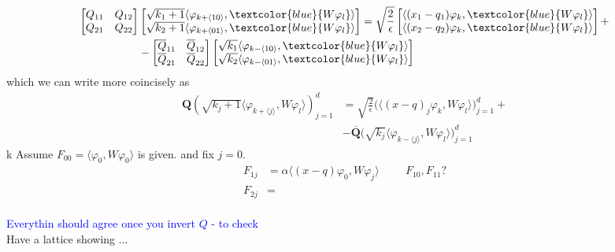 \begin{align}
  \begin{split}
    \begin{bmatrix}
    Q_{11} & Q_{12}
    \\
    Q_{21} & Q_{22}
  \end{bmatrix}
  &\begin{bmatrix}
  \sqrt{k_{1} + 1}
  \langle \varphi_{k + \langle 10 \rangle},
    \textcolor{blue}{W\varphi_l}\rangle
    \\
  \sqrt{k_{2} + 1}
  \langle \varphi_{k + \langle 01 \rangle},
    \textcolor{blue}{W\varphi_l} \rangle
  \end{bmatrix}
  =
  \sqrt{\frac{2}{\epsilon}}
  \begin{bmatrix}
    \langle (x_1 - q_1)\varphi_k, \textcolor{blue}{W \varphi_l} \rangle
    \\
    \langle (x_2 - q_2)\varphi_k, \textcolor{blue}{W \varphi_l} \rangle
  \end{bmatrix}
  +
  \\
   &-
  \begin{bmatrix}
    \overline{Q}_{11} & \overline{Q}_{12}
    \\
    \overline{Q}_{21} & \overline{Q}_{22}
  \end{bmatrix}
  \begin{bmatrix}
    \sqrt{k_1}
    \langle\varphi_{k - \langle 10 \rangle},
    \textcolor{blue}{W\varphi_l}\rangle
    \\
    \sqrt{k_2}
 \langle\varphi_{k - \langle 01 \rangle},
   \textcolor{blue}{W\varphi_l}\rangle  \end{bmatrix}
  \end{split}
\end{align}
which we can write more coincisely as
\begin{equation}
  \begin{split}
    \bm{Q} \left( \sqrt{k_j + 1}
    \langle \varphi_{k + \langle j \rangle}, 
    W \varphi_l 
    \rangle
  \right)_{j = 1}^d
  &= 
  \sqrt{\frac{2}{\epsilon}}
  \Big( \langle (x - q)_j \varphi_k,
  W \varphi_l \rangle 
  \Big)_{j=1}^d
  +
  \\
  &
  - \bm{\overline{Q}} 
  \Big( 
    \sqrt{k_j} \langle \varphi_{k - \langle j \rangle}, W \varphi_l  \rangle
  \Big)_{j=1}^d
  \end{split}
\end{equation}
k
Assume $F_{00} = \langle \varphi_0, W \varphi_0 \rangle$ is given.
and fix $j=0$.
\begin{equation}
  \begin{split}
    F_{1j} &= \alpha \langle (x - q) \varphi_0, W \varphi_j  \rangle
    \hspace{1cm} F_{10}, F_{11}?
    \\
    F_{2j} & =
  \end{split}
\end{equation}
\\
\textcolor{blue}{Everythin should agree once you invert $Q$ - to check}
\\
Have a lattice showing ...
%
